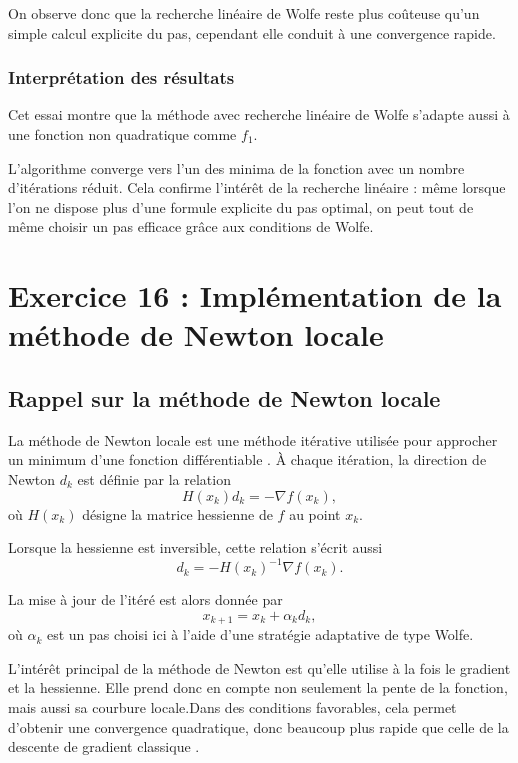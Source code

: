 \documentclass[a4paper,12pt]{article}
\begin{document}
	On observe donc que la recherche linéaire de Wolfe reste plus coûteuse qu'un simple calcul explicite du pas, cependant elle conduit à une convergence rapide.
	
	\subsubsection{Interprétation des résultats}
	
	Cet essai montre que la méthode avec recherche linéaire de Wolfe s'adapte aussi à une fonction non quadratique comme $f_1$.
	
	L'algorithme converge vers l'un des minima de la fonction avec un nombre d'itérations réduit. Cela confirme l'intérêt de la recherche linéaire : même lorsque l'on ne dispose plus d'une formule explicite du pas optimal, on peut tout de même choisir un pas efficace grâce aux conditions de Wolfe.
	
	\section{Exercice 16 : Implémentation de la méthode de Newton locale}
	
	\subsection{Rappel sur la méthode de Newton locale}
	
La méthode de Newton locale est une méthode itérative utilisée pour approcher un minimum d’une fonction différentiable \cite{nocedal2006,dennis1996,kantorovich1948}. À chaque itération, la direction de Newton \(d_k\) est définie par la relation
	\[
	H(x_k)d_k=-\nabla f(x_k),
	\]
	où \(H(x_k)\) désigne la matrice hessienne de \(f\) au point \(x_k\).
	
	Lorsque la hessienne est inversible, cette relation s’écrit aussi
	\[
	d_k=-H(x_k)^{-1}\nabla f(x_k).
	\]
	
	La mise à jour de l’itéré est alors donnée par
	\[
	x_{k+1}=x_k+\alpha_k d_k,
	\]
	où \(\alpha_k\) est un pas choisi ici à l’aide d’une stratégie adaptative de type Wolfe.
	
	L’intérêt principal de la méthode de Newton est qu’elle utilise à la fois le gradient et la hessienne. Elle prend donc en compte non seulement la pente de la fonction, mais aussi sa courbure locale.Dans des conditions favorables, cela permet d’obtenir une convergence quadratique, donc beaucoup plus rapide que celle de la descente de gradient classique \cite{nocedal2006,dennis1996}.
	
\end{document}
